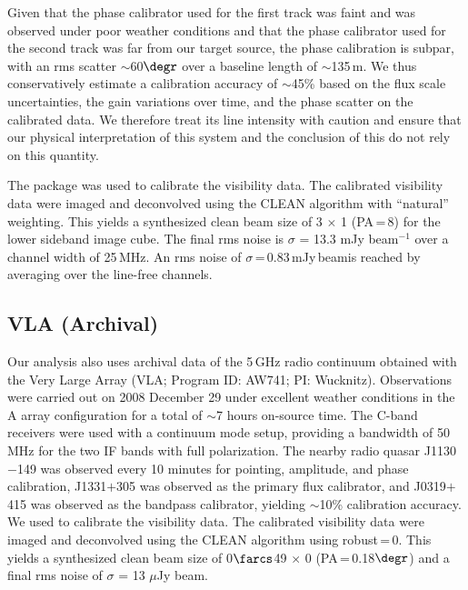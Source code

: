 \documentclass[]{emulateapj}
\begin{document}
%
%
Given that the phase calibrator used for the first track was faint and was
observed under poor weather conditions and that the phase calibrator used for
the second track was far from our target source, the phase calibration is
subpar, with an rms scatter $\sim$60$\degr$ over a baseline length of $\sim$135\,m.
We thus conservatively estimate
a calibration accuracy of $\sim$45\% based on the flux scale uncertainties,
the gain variations over time, and the phase scatter on the calibrated data. We
therefore treat its line intensity with caution and ensure that our physical interpretation
of this system and the conclusion of this do not rely on this quantity.

The  package was used to calibrate the visibility data.
The calibrated visibility data were
imaged and deconvolved using the CLEAN algorithm with ``natural'' weighting. This yields a synthesized clean
beam size of 3 $\times$ 1 (PA\,=\,8\degr) for the lower sideband
image cube. The final rms noise is $\sigma$ = 13.3 mJy beam$^{-1}$
over a channel width of 25\,MHz. An rms noise of
$\sigma$\,=\,0.83\,mJy\,beam\pmOne is reached by averaging over the
line-free channels.

\subsection{VLA (Archival)} %
Our analysis also uses archival data of the 5\,GHz
radio continuum obtained with the
Very Large Array (VLA; Program ID: AW741; PI: Wucknitz).
Observations were carried out on 2008 December 29 under excellent weather
conditions in the A array configuration for a total of $\sim$7 hours on-source time. The C-band receivers were used with a continuum mode setup,
providing a bandwidth of 50 MHz for the two IF bands with full polarization.
The nearby radio quasar J1130$-$149 was observed every 10 minutes for
pointing, amplitude, and phase calibration, J1331$+$305 was observed as the
primary flux calibrator, and J0319$+$415 was observed as the bandpass
calibrator, yielding $\sim$10\% calibration accuracy.
We used  to calibrate the visibility data.
The calibrated visibility data were imaged and deconvolved using
the CLEAN algorithm using robust\,=\,0. This yields a synthesized clean
beam size of 0$\farcs$49 $\times$ 0 (PA\,=\,0.18$\degr$) and a final
rms noise of $\sigma$ = 13 $\mu$Jy beam\pmOne.
\end{document}
